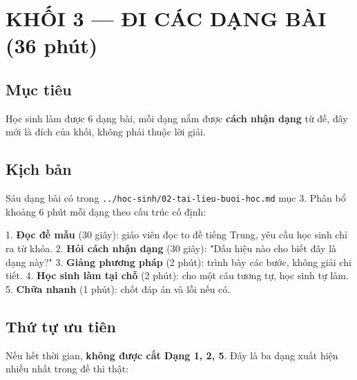 \documentclass[11pt, a4paper]{article}
\begin{document}
\section{KHỐI 3 — ĐI CÁC DẠNG BÀI (36 phút)}

\subsection{Mục tiêu}

Học sinh làm được 6 dạng bài, mỗi dạng nắm được \textbf{cách nhận dạng} từ đề, đây mới là đích của khối, không phải thuộc lời giải.

\subsection{Kịch bản}

Sáu dạng bài có trong \texttt{../hoc-sinh/02-tai-lieu-buoi-hoc.md} mục 3. Phân bổ khoảng 6 phút mỗi dạng theo cấu trúc cố định:

1. \textbf{Đọc đề mẫu} (30 giây): giáo viên đọc to đề tiếng Trung, yêu cầu học sinh chỉ ra từ khóa.
2. \textbf{Hỏi cách nhận dạng} (30 giây): "Dấu hiệu nào cho biết đây là dạng này?"
3. \textbf{Giảng phương pháp} (2 phút): trình bày các bước, không giải chi tiết.
4. \textbf{Học sinh làm tại chỗ} (2 phút): cho một câu tương tự, học sinh tự làm.
5. \textbf{Chữa nhanh} (1 phút): chốt đáp án và lỗi nếu có.

\subsection{Thứ tự ưu tiên}

Nếu hết thời gian, \textbf{không được cắt Dạng 1, 2, 5}. Đây là ba dạng xuất hiện nhiều nhất trong đề thi thật:

\end{document}
